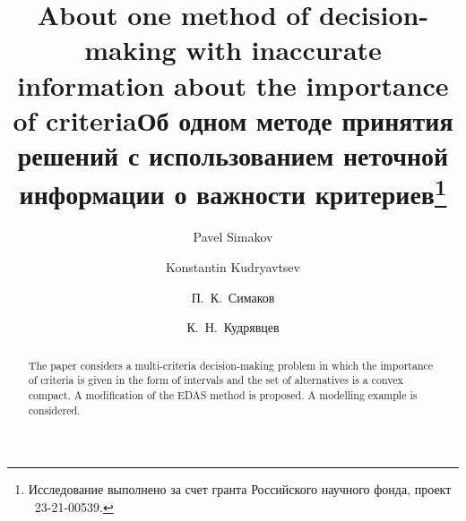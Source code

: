 \begin{englishtitle} %
\title{About one method of decision-making with inaccurate information about the importance of criteria}
\author{Pavel Simakov  \and  Konstantin Kudryavtsev
}

\maketitle

\begin{abstract}
The paper considers a multi-criteria decision-making problem in which the importance of criteria is given in the form of intervals and the set of alternatives is a convex compact. 
A modification of the EDAS method is proposed. A modelling example is considered. 

\end{abstract}
\end{englishtitle}

\iffalse
%
%


\documentclass[12pt]{llncs}  


\usepackage{iftex}

\ifPDFTeX
\usepackage[T2A]{fontenc}
\usepackage[utf8]{inputenc} %
\usepackage[english,russian]{babel}
\fi

\usepackage{todonotes} 

\usepackage[russian]{nla}


\fi

\title{Об одном методе принятия решений с использованием неточной информации о важности критериев\thanks{Исследование выполнено за счет гранта Российского научного фонда, проект \textnumero~23-21-00539.}}
\author{П.~К.~Симаков \and К.~Н.~Кудрявцев
}

